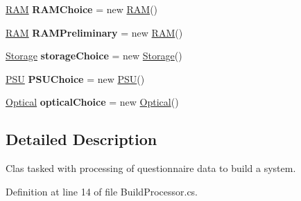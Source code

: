\begin{DoxyCompactItemize}
\item 
\hyperlink{class_business_objects_1_1_r_a_m}{R\+AM} {\bfseries R\+A\+M\+Choice} = new \hyperlink{class_business_objects_1_1_r_a_m}{R\+AM}()\hypertarget{class_business_logic_1_1_build_processor_ab1bfcbae80f18cc7b46906c06d2315eb}{}\label{class_business_logic_1_1_build_processor_ab1bfcbae80f18cc7b46906c06d2315eb}

\item 
\hyperlink{class_business_objects_1_1_r_a_m}{R\+AM} {\bfseries R\+A\+M\+Preliminary} = new \hyperlink{class_business_objects_1_1_r_a_m}{R\+AM}()\hypertarget{class_business_logic_1_1_build_processor_a3c757b2ba0280a37e48a7172078da541}{}\label{class_business_logic_1_1_build_processor_a3c757b2ba0280a37e48a7172078da541}

\item 
\hyperlink{class_business_objects_1_1_storage}{Storage} {\bfseries storage\+Choice} = new \hyperlink{class_business_objects_1_1_storage}{Storage}()\hypertarget{class_business_logic_1_1_build_processor_a787043eb1b824d8ca99f451f90c3b05d}{}\label{class_business_logic_1_1_build_processor_a787043eb1b824d8ca99f451f90c3b05d}

\item 
\hyperlink{class_business_objects_1_1_p_s_u}{P\+SU} {\bfseries P\+S\+U\+Choice} = new \hyperlink{class_business_objects_1_1_p_s_u}{P\+SU}()\hypertarget{class_business_logic_1_1_build_processor_a132211a2121f81b04173466a6ddcbb55}{}\label{class_business_logic_1_1_build_processor_a132211a2121f81b04173466a6ddcbb55}

\item 
\hyperlink{class_business_objects_1_1_optical}{Optical} {\bfseries optical\+Choice} = new \hyperlink{class_business_objects_1_1_optical}{Optical}()\hypertarget{class_business_logic_1_1_build_processor_a9b9203f51653d018460765d3ac578327}{}\label{class_business_logic_1_1_build_processor_a9b9203f51653d018460765d3ac578327}

\end{DoxyCompactItemize}


\subsection{Detailed Description}
Clas tasked with processing of questionnaire data to build a system. 



Definition at line 14 of file Build\+Processor.\+cs.



